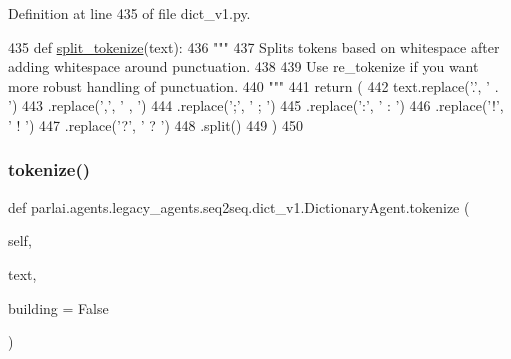 Definition at line 435 of file dict\+\_\+v1.\+py.


\begin{DoxyCode}
435     \textcolor{keyword}{def }\hyperlink{namespaceparlai_1_1mturk_1_1tasks_1_1wizard__of__wikipedia_1_1worlds_a040aaf5ecfbddec14f321279454f85a8}{split\_tokenize}(text):
436         \textcolor{stringliteral}{"""}
437 \textcolor{stringliteral}{        Splits tokens based on whitespace after adding whitespace around punctuation.}
438 \textcolor{stringliteral}{}
439 \textcolor{stringliteral}{        Use re\_tokenize if you want more robust handling of punctuation.}
440 \textcolor{stringliteral}{        """}
441         \textcolor{keywordflow}{return} (
442             text.replace(\textcolor{stringliteral}{'.'}, \textcolor{stringliteral}{' . '})
443             .replace(\textcolor{stringliteral}{','}, \textcolor{stringliteral}{' , '})
444             .replace(\textcolor{stringliteral}{';'}, \textcolor{stringliteral}{' ; '})
445             .replace(\textcolor{stringliteral}{':'}, \textcolor{stringliteral}{' : '})
446             .replace(\textcolor{stringliteral}{'!'}, \textcolor{stringliteral}{' ! '})
447             .replace(\textcolor{stringliteral}{'?'}, \textcolor{stringliteral}{' ? '})
448             .split()
449         )
450 
\end{DoxyCode}
\mbox{\label{classparlai_1_1agents_1_1legacy__agents_1_1seq2seq_1_1dict__v1_1_1DictionaryAgent_af8cf51195d4443615727cf0bdcdace0f}} 
\subsubsection{\texorpdfstring{tokenize()}{tokenize()}}
{\footnotesize\ttfamily def parlai.\+agents.\+legacy\+\_\+agents.\+seq2seq.\+dict\+\_\+v1.\+Dictionary\+Agent.\+tokenize (\begin{DoxyParamCaption}\item[{}]{self,  }\item[{}]{text,  }\item[{}]{building = {\ttfamily False} }\end{DoxyParamCaption})}

